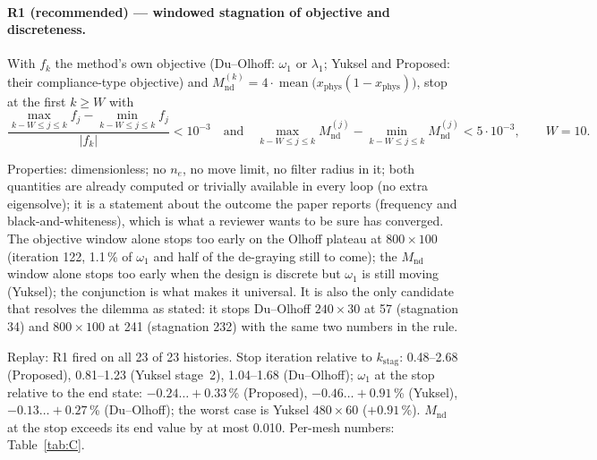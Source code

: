 \documentclass[11pt,a4paper]{article}
\newcommand{\Mnd}{M_{\mathrm{nd}}}
\newcommand{\kstag}{k_{\mathrm{stag}}}
\newcommand{\me}[2]{$#1\times#2$}
\begin{document}
\paragraph{R1 (recommended) --- windowed stagnation of objective and discreteness.}
With $f_k$ the method's own objective (Du--Olhoff: $\omega_1$ or $\lambda_1$;
Yuksel and Proposed: their compliance-type objective) and
$\Mnd^{(k)} = 4\cdot\operatorname{mean}\bigl(x_{\mathrm{phys}}(1-x_{\mathrm{phys}})\bigr)$,
stop at the first $k \ge W$ with
\begin{equation}
\label{eq:R1}
\frac{\max\limits_{k-W\le j\le k} f_j - \min\limits_{k-W\le j\le k} f_j}{|f_k|} < 10^{-3}
\quad\text{and}\quad
\max_{k-W\le j\le k} \Mnd^{(j)} - \min_{k-W\le j\le k} \Mnd^{(j)} < 5\cdot10^{-3},
\qquad W = 10.
\end{equation}

Properties: dimensionless; no $n_e$, no move limit, no filter radius in it; both
quantities are already computed or trivially available in every loop (no extra
eigensolve); it is a statement about the outcome the paper reports (frequency
and black-and-whiteness), which is what a reviewer wants to be sure has
converged. The objective window alone stops too early on the Olhoff plateau at
\me{800}{100} (iteration 122, 1.1\,\% of $\omega_1$ and half of the de-graying
still to come); the $\Mnd$ window alone stops too early when the design is
discrete but $\omega_1$ is still moving (Yuksel); the conjunction is what makes
it universal. It is also the only candidate that resolves the dilemma as
stated: it stops Du--Olhoff \me{240}{30} at 57 (stagnation 34) and
\me{800}{100} at 241 (stagnation 232) with the same two numbers in the rule.

Replay: R1 fired on all 23 of 23 histories. Stop iteration relative to
$\kstag$: 0.48--2.68 (Proposed), 0.81--1.23 (Yuksel stage~2), 1.04--1.68
(Du--Olhoff); $\omega_1$ at the stop relative to the end state:
$-0.24 \ldots +0.33$\,\% (Proposed), $-0.46 \ldots +0.91$\,\% (Yuksel),
$-0.13 \ldots +0.27$\,\% (Du--Olhoff); the worst case is Yuksel \me{480}{60}
($+0.91$\,\%). $\Mnd$ at the stop exceeds its end value by at most 0.010.
Per-mesh numbers: Table~\ref{tab:C}.
\end{document}
